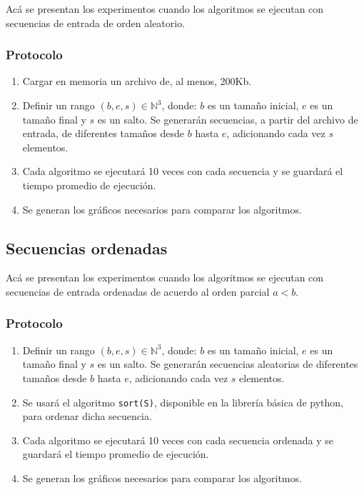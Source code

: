 \documentclass[letter]{article}
\begin{document}
Acá se presentan los experimentos cuando los algoritmos se ejecutan con secuencias de entrada de orden aleatorio.

\subsubsection{Protocolo}
\begin{enumerate}
    \item Cargar en memoria un archivo de, al menos, 200Kb.
    \item Definir un rango $(b,e,s)\in\mathbb{N}^3$, donde: $b$ es un tamaño inicial, $e$ es un tamaño final y $s$ es un salto. Se generarán secuencias, a partir del archivo de entrada, de diferentes tamaños desde $b$ hasta $e$, adicionando cada vez $s$ elementos.
    \item Cada algoritmo se ejecutará 10 veces con cada secuencia y se guardará el tiempo promedio de ejecución.
    \item Se generan los gráficos necesarios para comparar los algoritmos.
\end{enumerate}

\subsection{Secuencias ordenadas} \label{experimentos:ordenadas}

Acá se presentan los experimentos cuando los algoritmos se ejecutan con secuencias de entrada ordenadas de acuerdo al orden parcial $a<b$.

\subsubsection{Protocolo}
\begin{enumerate}
    \item Definir un rango $(b,e,s)\in\mathbb{N}^3$, donde: $b$ es un tamaño inicial, $e$ es un tamaño final y $s$ es un salto. Se generarán secuencias aleatorias de diferentes tamaños desde $b$ hasta $e$, adicionando cada vez $s$ elementos.
    \item Se usará el algoritmo \texttt{sort(S)}, disponible en la librería básica de python, para ordenar dicha secuencia.
    \item Cada algoritmo se ejecutará 10 veces con cada secuencia ordenada y se guardará el tiempo promedio de ejecución.
    \item Se generan los gráficos necesarios para comparar los algoritmos.
\end{enumerate}
\end{document}
